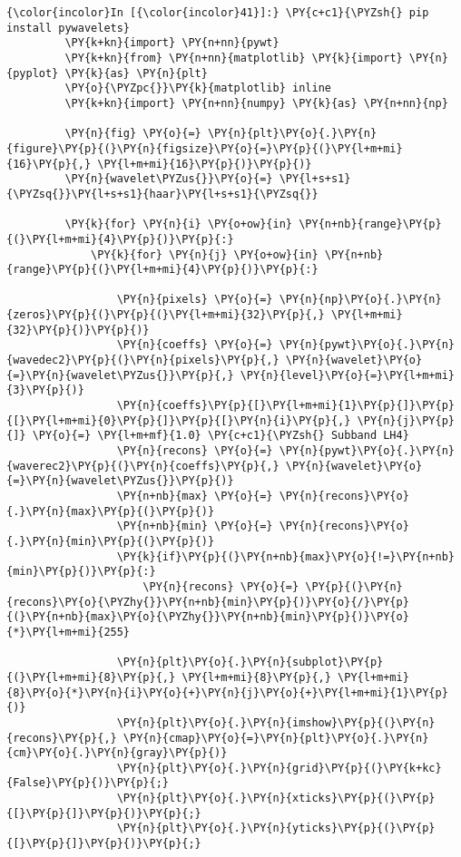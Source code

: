     \begin{Verbatim}[commandchars=\\\{\}]
{\color{incolor}In [{\color{incolor}41}]:} \PY{c+c1}{\PYZsh{} pip install pywavelets}
         \PY{k+kn}{import} \PY{n+nn}{pywt}
         \PY{k+kn}{from} \PY{n+nn}{matplotlib} \PY{k}{import} \PY{n}{pyplot} \PY{k}{as} \PY{n}{plt}
         \PY{o}{\PYZpc{}}\PY{k}{matplotlib} inline
         \PY{k+kn}{import} \PY{n+nn}{numpy} \PY{k}{as} \PY{n+nn}{np}
         
         \PY{n}{fig} \PY{o}{=} \PY{n}{plt}\PY{o}{.}\PY{n}{figure}\PY{p}{(}\PY{n}{figsize}\PY{o}{=}\PY{p}{(}\PY{l+m+mi}{16}\PY{p}{,} \PY{l+m+mi}{16}\PY{p}{)}\PY{p}{)}
         \PY{n}{wavelet\PYZus{}}\PY{o}{=} \PY{l+s+s1}{\PYZsq{}}\PY{l+s+s1}{haar}\PY{l+s+s1}{\PYZsq{}}
         
         \PY{k}{for} \PY{n}{i} \PY{o+ow}{in} \PY{n+nb}{range}\PY{p}{(}\PY{l+m+mi}{4}\PY{p}{)}\PY{p}{:}
             \PY{k}{for} \PY{n}{j} \PY{o+ow}{in} \PY{n+nb}{range}\PY{p}{(}\PY{l+m+mi}{4}\PY{p}{)}\PY{p}{:}
         
                 \PY{n}{pixels} \PY{o}{=} \PY{n}{np}\PY{o}{.}\PY{n}{zeros}\PY{p}{(}\PY{p}{(}\PY{l+m+mi}{32}\PY{p}{,} \PY{l+m+mi}{32}\PY{p}{)}\PY{p}{)}
                 \PY{n}{coeffs} \PY{o}{=} \PY{n}{pywt}\PY{o}{.}\PY{n}{wavedec2}\PY{p}{(}\PY{n}{pixels}\PY{p}{,} \PY{n}{wavelet}\PY{o}{=}\PY{n}{wavelet\PYZus{}}\PY{p}{,} \PY{n}{level}\PY{o}{=}\PY{l+m+mi}{3}\PY{p}{)}
                 \PY{n}{coeffs}\PY{p}{[}\PY{l+m+mi}{1}\PY{p}{]}\PY{p}{[}\PY{l+m+mi}{0}\PY{p}{]}\PY{p}{[}\PY{n}{i}\PY{p}{,} \PY{n}{j}\PY{p}{]} \PY{o}{=} \PY{l+m+mf}{1.0} \PY{c+c1}{\PYZsh{} Subband LH4}
                 \PY{n}{recons} \PY{o}{=} \PY{n}{pywt}\PY{o}{.}\PY{n}{waverec2}\PY{p}{(}\PY{n}{coeffs}\PY{p}{,} \PY{n}{wavelet}\PY{o}{=}\PY{n}{wavelet\PYZus{}}\PY{p}{)}
                 \PY{n+nb}{max} \PY{o}{=} \PY{n}{recons}\PY{o}{.}\PY{n}{max}\PY{p}{(}\PY{p}{)}
                 \PY{n+nb}{min} \PY{o}{=} \PY{n}{recons}\PY{o}{.}\PY{n}{min}\PY{p}{(}\PY{p}{)}
                 \PY{k}{if}\PY{p}{(}\PY{n+nb}{max}\PY{o}{!=}\PY{n+nb}{min}\PY{p}{)}\PY{p}{:}
                     \PY{n}{recons} \PY{o}{=} \PY{p}{(}\PY{n}{recons}\PY{o}{\PYZhy{}}\PY{n+nb}{min}\PY{p}{)}\PY{o}{/}\PY{p}{(}\PY{n+nb}{max}\PY{o}{\PYZhy{}}\PY{n+nb}{min}\PY{p}{)}\PY{o}{*}\PY{l+m+mi}{255}
                     
                 \PY{n}{plt}\PY{o}{.}\PY{n}{subplot}\PY{p}{(}\PY{l+m+mi}{8}\PY{p}{,} \PY{l+m+mi}{8}\PY{p}{,} \PY{l+m+mi}{8}\PY{o}{*}\PY{n}{i}\PY{o}{+}\PY{n}{j}\PY{o}{+}\PY{l+m+mi}{1}\PY{p}{)}
                 \PY{n}{plt}\PY{o}{.}\PY{n}{imshow}\PY{p}{(}\PY{n}{recons}\PY{p}{,} \PY{n}{cmap}\PY{o}{=}\PY{n}{plt}\PY{o}{.}\PY{n}{cm}\PY{o}{.}\PY{n}{gray}\PY{p}{)}
                 \PY{n}{plt}\PY{o}{.}\PY{n}{grid}\PY{p}{(}\PY{k+kc}{False}\PY{p}{)}\PY{p}{;}
                 \PY{n}{plt}\PY{o}{.}\PY{n}{xticks}\PY{p}{(}\PY{p}{[}\PY{p}{]}\PY{p}{)}\PY{p}{;}
                 \PY{n}{plt}\PY{o}{.}\PY{n}{yticks}\PY{p}{(}\PY{p}{[}\PY{p}{]}\PY{p}{)}\PY{p}{;}
\end{Verbatim}



